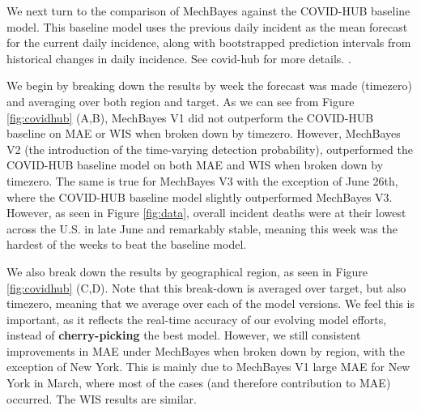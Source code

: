 \documentclass[11pt]{amsart}
\begin{document}
We next turn to the comparison of MechBayes against the COVID-HUB baseline model. This baseline model uses the previous daily incident as the mean forecast for the current daily incidence, along with  bootstrapped prediction intervals from historical changes in daily incidence. See covid-hub for more details. \cite{covid-hub}. 

We begin by breaking down the results by week the forecast was made (timezero) and averaging over both region and target. As we can see from Figure \ref{fig:covidhub} (A,B), MechBayes V1 did not outperform the COVID-HUB baseline on MAE or WIS when broken down by timezero. However, MechBayes V2 (the introduction of the time-varying detection probability), outperformed the COVID-HUB baseline model on both MAE and WIS when broken down by timezero. The same is true for MechBayes V3 with the exception of June 26th, where the COVID-HUB baseline model slightly outperformed MechBayes V3. However, as seen in Figure \ref{fig:data}, overall incident deaths were at their lowest across the U.S. in late June and remarkably stable, meaning this week was the hardest of the weeks to beat the baseline model. 

We also break down the results by geographical region, as seen in Figure \ref{fig:covidhub} (C,D). Note that this break-down is averaged over target, but also timezero, meaning that we average over each of the model versions. We feel this is important, as it reflects the real-time accuracy of our evolving model efforts, instead of \textbf{cherry-picking} the best model. However, we still consistent improvements in MAE under MechBayes when broken down by region, with the exception of New York. This is mainly due to MechBayes V1 large MAE for New York in March, where most of the cases (and therefore contribution to MAE) occurred. The WIS results are similar. 
\end{document}
